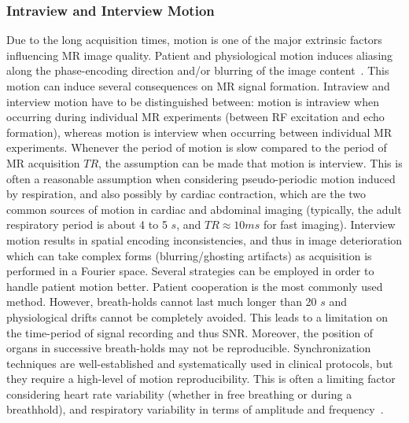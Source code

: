 \documentclass[english,version-2022-01]{uzl-thesis} %
\begin{document}
\subsubsection{Intraview and Interview Motion} \label{SubSubSec:IntraviewandInterviewMotion}
Due to the long acquisition times, motion is one of the major extrinsic factors influencing MR image quality. Patient and physiological motion induces aliasing along the phase-encoding direction and/or blurring of the image content~\cite{Kuestner2022}.
This motion can induce several consequences on MR signal formation. Intraview and interview motion have to be distinguished between: motion is intraview when occurring during individual MR experiments (between RF excitation and echo formation), whereas motion is interview when occurring between individual MR experiments. Whenever the period of motion is slow compared to the period of MR acquisition 
$TR$, the assumption can be made that motion is interview. This is often a reasonable assumption when considering pseudo-periodic motion induced by respiration, and also possibly by cardiac contraction, which are the two common sources of motion in cardiac and abdominal imaging (typically, the adult respiratory period is about 4 to 5 $s$, and $TR \approx 10 ms$ for fast imaging). Interview motion results in spatial encoding inconsistencies, and thus in image deterioration which can take complex forms (blurring/ghosting artifacts) as acquisition is performed in a Fourier space. Several strategies can be employed in order to handle patient motion better. Patient cooperation is the most commonly used method. However, breath-holds cannot last much longer than 20 $s$ and physiological drifts cannot be completely avoided. This leads to a limitation on the time-period of signal recording and thus SNR. Moreover, the position of organs in successive breath-holds may not be reproducible. Synchronization techniques are well-established and systematically used in clinical protocols, but they require a high-level of motion reproducibility. This is often a limiting factor considering heart rate variability (whether in free breathing or during a breathhold), and respiratory variability in terms of amplitude and frequency~\cite{GRICS}. 
\end{document}
